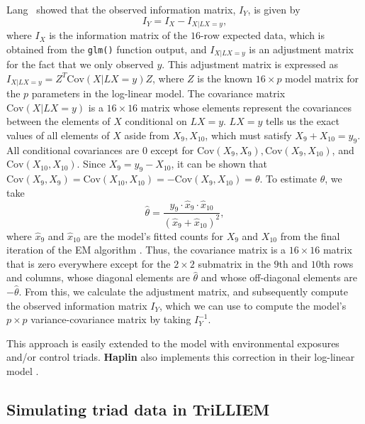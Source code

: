 Lang~\cite{Lang92} showed that the observed information matrix, $I_Y$, is given by
\begin{equation*}
  I_Y = I_X - I_{X|LX = y},
\end{equation*}
where $I_X$ is the information matrix of the $16$-row expected data, which is obtained from the \texttt{glm()} function output, and $I_{X|LX = y}$ is an adjustment matrix for the fact that we only observed $y$.
This adjustment matrix is expressed as $I_{X|LX = y} = Z^T \mathrm{Cov}(X | LX = y) Z$, where $Z$ is the known $16 \times p$ model matrix for the $p$ parameters in the log-linear model.
The covariance matrix $\mathrm{Cov}(X | LX = y)$ is a $16 \times 16$ matrix whose elements represent the covariances between the elements of $X$ conditional on $LX = y$.
$LX = y$ tells us the exact values of all elements of $X$ aside from $X_9, X_{10}$, which must satisfy $X_9 + X_{10} = y_9$.
All conditional covariances are $0$ except for $\mathrm{Cov}(X_9, X_9), \mathrm{Cov}(X_9, X_{10})$, and $\mathrm{Cov}(X_{10}, X_{10})$.
Since $X_9 = y_9 - X_{10}$, it can be shown that $\mathrm{Cov}(X_9, X_9) = \mathrm{Cov}(X_{10}, X_{10}) = - \mathrm{Cov}(X_9, X_{10})=\theta$.
To estimate $\theta$, we take
\begin{equation*}
\hat{\theta} = \frac{y_9 \cdot \hat{x}_9 \cdot \hat{x}_{10}}{\left(\hat{x}_9 + \hat{x}_{10}\right)^2},
\end{equation*}
where $\hat{x}_9$ and $\hat{x}_{10}$ are the model's fitted counts for $X_9$ and $X_{10}$ from the final iteration of the EM algorithm \cite[eq.\,3.2]{Lang92}.
Thus, the covariance matrix is a $16 \times 16$ matrix that is zero everywhere except for the $2\times2$ submatrix in the $9$th and $10$th rows and columns, whose diagonal elements are $\hat\theta$ and whose off-diagonal elements are $-\hat\theta$.
From this, we calculate the adjustment matrix, and subsequently compute the observed information matrix $I_Y$, which we can use to compute the model's $p\times p$ variance-covariance matrix by taking $I_Y^{-1}$.

This approach is easily extended to the model with environmental exposures and/or control triads.
\textbf{Haplin} also implements this correction in their log-linear model \cite[p.\,253]{Juge+12}.

\subsection{Simulating triad data in TriLLIEM}

